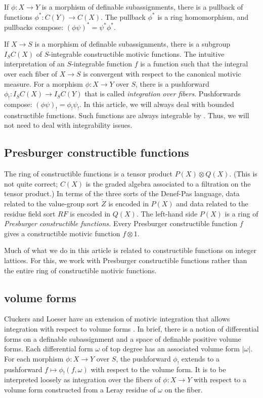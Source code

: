 If $\phi:X\to Y$ is a morphism of definable subassignments, there is a pullback of functions $\phi^*:C(Y)\to C(X)$.  The
pullback $\phi^*$ is a ring homomorphism, and  pullbacks compose: $(\phi\psi)^* = \psi^* \phi^*$.

If $X\to S$ is a morphism of definable subassignments, there is  a subgroup $I_S C(X)$ of $S$-integrable constructible motivic functions.
The intuitive interpretation of an $S$-integrable function $f$ is a function such that the integral over each fiber of $X\to S$ 
is convergent with respect to the canonical motivic measure.  For a morphism $\phi: X\to Y$ over $S$, there is a 
pushforward $\phi_!:I_SC(X)\to I_SC(Y)$ that is called {\it integration over fibers}.  Pushforwards compose: $(\phi\psi)_! = \phi_!\psi_!$.
In this article, we will always deal with bounded constructible functions.  Such functions are always integrable by 
\cite[Prop~12.2.2]{cluckers2008constructible}.
Thus, we will not need to deal with integrability issues.

\subsection{Presburger constructible functions}

The ring of constructible functions is a tensor product $P(X) \otimes Q(X)$.  (This is not quite correct; $C(X)$ is the graded
algebra associated to a filtration on the tensor product.)  In terms of the three sorts of the Denef-Pas language,
data related to the value-group sort $\ring{Z}$ is encoded in $P(X)$ and data related to the residue field sort $RF$ is encoded
in $Q(X)$.  The left-hand side $P(X)$ is a ring of {\it Presburger
constructible functions.}  Every Presburger constructible function $f$ gives a constructible motivic function $f\otimes 1$.

Much of what we do in this article is related to constructible functions on integer lattices.  For this, we work with Presburger
constructible functions rather than the entire ring of constructible motivic functions.

\subsection{volume forms}

Cluckers and Loeser have an extension of motivic integration that allows integration with respect to volume
forms \cite[\S8]{cluckers2008constructible}.  In brief, there is a notion of differential forms on a definable subassignment
and a space of definable positive volume forms.  Each differential form $\omega$ of top degree has an associated volume
form $|\omega|$.   For each morphism $\phi:X\to Y$ over $S$, the pushforward $\phi_!$ extends to a pushforward
$f \mapsto \phi_!(f,\omega)$ with respect to the volume form.   It is to be interpreted loosely as integration over
the fibers of $\phi:X\to Y$ with respect to a volume form constructed from a Leray residue of $\omega$ on the fiber.

